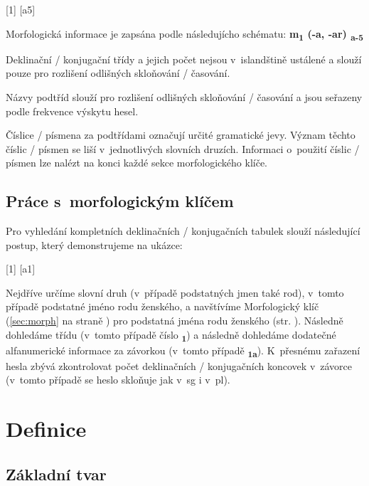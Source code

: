 \blspace
  \dicEntry {} [1] [a5]
\blspace

Morfologická informace je zapsána podle následujícho schématu: \textbf{m{\textsubscript{1}} (-a, -ar) {\textsubscript{a-5}} }

\tableB

Deklinační / konjugační třídy a jejich počet nejsou v~islandštině ustálené a slouží pouze pro rozlišení odlišných skloňování / časování.

Názvy podtříd slouží pro rozlišení odlišných skloňování / časování a jsou seřazeny podle frekvence výskytu hesel.

Číslice / písmena za podtřídami označují určité gramatické jevy. Význam těchto číslic / písmen se liší v~jednotlivých slovních druzích. Informaci o~použití číslic / písmen lze nalézt na konci každé sekce morfologického klíče.

\subsection*{Práce s~morfologickým klíčem}

Pro vyhledání kompletních deklinačních / konjugačních tabulek slouží následující postup, který demonstrujeme na ukázce:

\blspace
  \dicEntry {} [1] [a1]
\blspace

Nejdříve určíme slovní druh (v~případě podstatných jmen také rod), v~tomto případě podstatné jméno rodu ženského, a navštívíme Morfologický klíč (\ref{sec:morph} na straně \pageref{sec:morph}) pro podstatná jména rodu ženského (str. \pageref{sec:morph_f}).
Následně dohledáme třídu (v~tomto případě číslo {\textsubscript{\textbf{1}}}) a následně dohledáme dodatečné alfanumerické informace za závorkou (v~tomto případě {\textsubscript{\textbf{1a}}}).
K~přesnému zařazení hesla zbývá zkontrolovat počet deklinačních / konjugačních koncovek v~závorce (v~tomto případě se heslo skloňuje jak v~sg i v~pl).

\tableC

\section{Definice}

\subsection*{Základní tvar}

